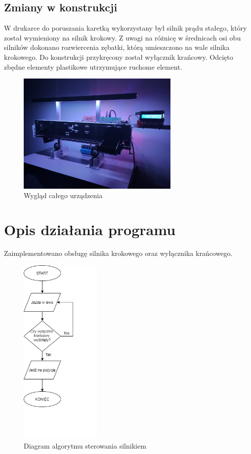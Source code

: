 \documentclass[10pt, a4paper]{article}
\begin{document}
\subsection{Zmiany w konstrukcji}
W drukarce do poruszania karetką wykorzystany był silnik prądu stałego, który został wymieniony na silnik krokowy. Z uwagi na różnicę w średnicach osi obu silników dokonano rozwiercenia zębatki, którą umieszczono na wale silnika krokowego. Do konstrukcji przykręcony został wyłącznik krańcowy.
Odcięto zbędne elementy plastikowe utrzymujące ruchome element.


\begin{figure}[H]
	\centering
	\includegraphics[width=0.7\textwidth]{barman.jpg}
	\caption{Wygląd całego urządzenia}
	\label{fig:Barman}
\end{figure}
\newpage


\section{Opis działania programu}

Zaimplementowano obsługę silnika krokowego oraz wyłącznika krańcowego.

\begin{figure}[H]
	\centering
	\includegraphics[width=0.35\textwidth]{algorytm2.png}
	\caption{Diagram algorytmu sterowania silnikiem}
	\label{fig:Diagram}
\end{figure}
\end{document}
